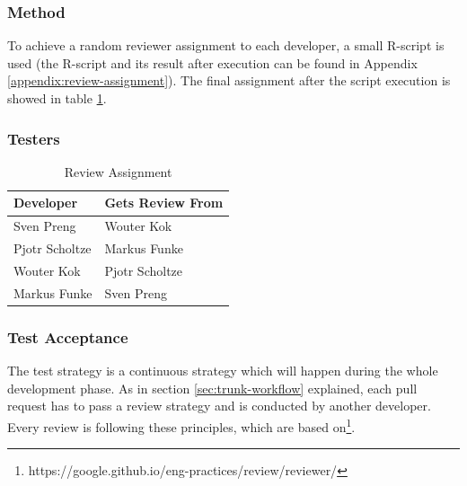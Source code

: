 \documentclass[a4paper]{article}
\newcommand{\arraystrechlength}{1.5}
\begin{document}
\subsubsection*{Method}
To achieve a random reviewer assignment to each developer, a small R-script is used (the R-script and its result after execution can be found in Appendix \ref{appendix:review-assignment}). The final assignment after the script execution is showed in table \ref{table:review-assignment}.


\subsubsection*{Testers}
\begin{table}[h]
{\renewcommand{\arraystretch}{\arraystrechlength}
    \begin{tabular}{ | m{100pt} | m{180pt} | }
    
    \hline
    \rowcolor{vu-blue}
    \textcolor{vu-white}{\textbf{Developer}} & \textcolor{vu-white}{\textbf{Gets Review From}} \\ \hline
    
    Sven Preng &
    Wouter Kok
    \\ \hline
    
    Pjotr Scholtze &
    Markus Funke
    \\ \hline
    
    Wouter Kok &
    Pjotr Scholtze
    \\ \hline
    
    Markus Funke &
    Sven Preng
    \\ \hline
    
    \end{tabular}
}
\caption{Review Assignment}
\label{table:review-assignment}
\end{table}


\subsubsection*{Test Acceptance}
The test strategy is a continuous strategy which will happen during the whole development phase. As in section \ref{sec:trunk-workflow} explained, each pull request has to pass a review strategy and is conducted by another developer. Every review is following these principles, which are based on\footnote{https://google.github.io/eng-practices/review/reviewer/}.
\end{document}
